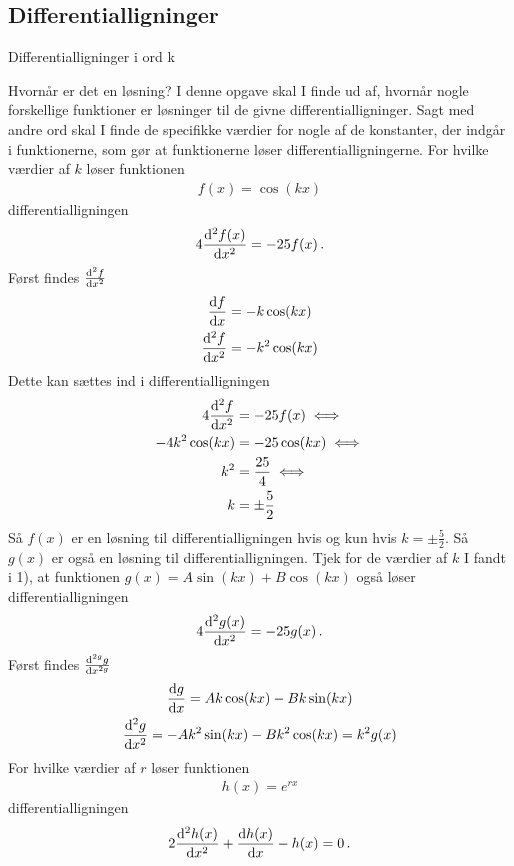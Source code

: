 \subsection*{Differentialligninger}
\begin{opgave}[1]{Differentialligninger i ord}
k
\end{opgave}

\begin{opgave}[2]{Hvornår er det en løsning?}
	I denne opgave skal I finde ud af, hvornår nogle forskellige funktioner er løsninger til de givne differentialligninger. Sagt med andre ord skal I finde de specifikke værdier for nogle af de konstanter, der indgår i funktionerne, som gør at funktionerne løser differentialligningerne.
	\opg For hvilke værdier af $k$ løser funktionen
	\begin{align*}
	f(x) = \cos (kx)
	\end{align*}
	differentialligningen
	\begin{align*}
	4 \dv[2]{f(x)}{x} = - 25f(x) \, .
	\end{align*}
	Først findes $\dv[2]{f}{x}$
	\begin{align*}
	\dv{f}{x}&=-k\cos(kx)\\
	\dv[2]{f}{x}&=-k^2\cos(kx)
	\end{align*}
	Dette kan sættes ind i differentialligningen
	\begin{align*}
	    4\dv[2]{f}{x}&=-25f(x)\iff\\
	    -4k^2\cos(kx)&=-25\cos(kx)\iff\\
	    k^2&=\frac{25}{4}\iff\\
	    k&=\pm \frac{5}{2}
	\end{align*}
	Så $f(x)$ er en løsning til differentialligningen hvis og kun hvis $k=\pm\frac{5}{2}$.
		Så $g(x)$ er også en løsning til differentialligningen.
	\opg Tjek for de værdier af $k$ I fandt i 1), at funktionen $g(x) = A \sin (kx) + B \cos (kx)$ også løser differentialligningen
	\begin{align*}
	4 \dv[2]{g(x)}{x} = -25 g(x) \, .
	\end{align*}
	Først findes $\dv[2g]{g}{x}$
	\begin{gather*}
	    \dv{g}{x}=Ak\cos(kx)-Bk\sin(kx)\\
	    \dv[2]{g}{x}=-Ak^2\sin(kx)-Bk^2\cos(kx)=k^2g(x)
	\end{gather*}
	\opg For hvilke værdier af $r$ løser funktionen
	\begin{align*}
	h(x) = e^{rx}
	\end{align*}
	differentialligningen
	\begin{align*}
	2 \dv[2]{h(x)}{x} + \dv{h(x)}{x} - h(x) = 0 \, .
	\end{align*}
	

\end{opgave}
